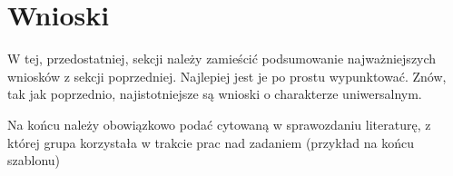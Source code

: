 \documentclass{classrep}
\begin{document}
\section{Wnioski}
{\color{blue}W tej, przedostatniej, sekcji należy zamieścić podsumowanie
najważniejszych wniosków z sekcji poprzedniej. Najlepiej jest je po prostu
wypunktować. Znów, tak jak poprzednio, najistotniejsze są wnioski o
charakterze uniwersalnym.}


\begin{thebibliography}{0}
\end{thebibliography}
{\color{blue}
Na końcu należy obowiązkowo podać cytowaną w sprawozdaniu
literaturę, z której grupa korzystała w trakcie prac nad zadaniem (przykład na
końcu szablonu)}
\end{document}
